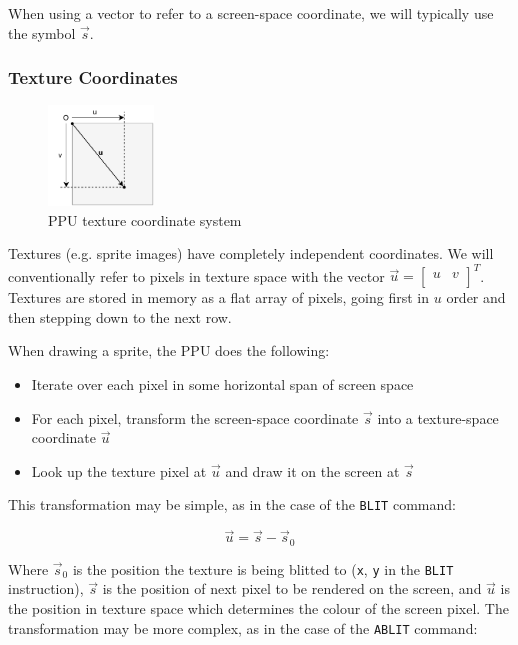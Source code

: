 When using a vector to refer to a screen-space coordinate, we will typically use the symbol $\vec{s}$.

\subsubsection*{Texture Coordinates}

\begin{figure}[H]
\centering
\caption{PPU texture coordinate system}
\label{diagram:ppu_coord_texture}
\includegraphics[width=0.25\textwidth]{diagrams/ppu_coord_texture.pdf}
\end{figure}

Textures (e.g. sprite images) have completely independent coordinates. We will conventionally refer to pixels in texture space with the vector $\vec{u} = \begin{bmatrix} u & v \\ \end{bmatrix}^T$. Textures are stored in memory as a flat array of pixels, going first in $u$ order and then stepping down to the next row.

When drawing a sprite, the PPU does the following:

\begin{itemize}
	\item Iterate over each pixel in some horizontal span of screen space
	\item For each pixel, transform the screen-space coordinate $\vec{s}$ into a texture-space coordinate $\vec{u}$
	\item Look up the texture pixel at $\vec{u}$ and draw it on the screen at $\vec{s}$
\end{itemize}

This transformation may be simple, as in the case of the {\tt BLIT} command:

\[
\vec{u} = \vec{s} - \vec{s}_0
\]

Where $\vec{s}_0$ is the position the texture is being blitted to ({\tt x}, {\tt y} in the {\tt BLIT} instruction), $\vec{s}$ is the position of next pixel to be rendered on the screen, and $\vec{u}$ is the position in texture space which determines the colour of the screen pixel. The transformation may be more complex, as in the case of the {\tt ABLIT} command:

